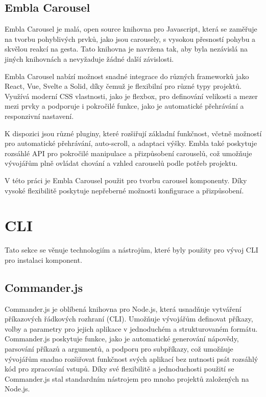 \subsection{Embla Carousel}
Embla Carousel je malá, open source knihovna pro Javascript, která se zaměřuje na tvorbu pohyblivých prvků, jako jsou carousely, s vysokou přesností pohybu a skvělou reakcí na gesta. Tato knihovna je navržena tak, aby byla nezávislá na jiných knihovnách a nevyžaduje žádné další závislosti. \cite{EmblaCarousel}

Embla Carousel nabízí možnost snadné integrace do různých frameworků jako React, Vue, Svelte a Solid, díky čemuž je flexibilní pro různé typy projektů. Využívá moderní CSS vlastnosti, jako je flexbox, pro definování velikosti a mezer mezi prvky a podporuje i pokročilé funkce, jako je automatické přehrávání a responzivní nastavení.

K dispozici jsou různé pluginy, které rozšiřují základní funkčnost, včetně možností pro automatické přehrávání, auto-scroll, a adaptaci výšky. Embla také poskytuje rozsáhlé API pro pokročilé manipulace a přizpůsobení carouselů, což umožňuje vývojářům plně ovládat chování a vzhled carouselů podle potřeb projektu.

V této práci je Embla Carousel použit pro tvorbu carousel komponenty. Díky vysoké flexibilitě poskytuje nepřeberné možnosti konfigurace a přizpůsobení.

\section{CLI}
Tato sekce se věnuje technologiím a nástrojům, které byly použity pro vývoj CLI pro instalaci komponent.

\subsection{Commander.js}
Commander.js je oblíbená knihovna pro Node.js, která usnadňuje vytváření příkazových řádkových rozhraní (CLI). Umožňuje vývojářům definovat příkazy, volby a parametry pro jejich aplikace v jednoduchém a strukturovaném formátu. Commander.js poskytuje funkce, jako je automatické generování nápovědy, parsování příkazů a argumentů, a podporu pro subpříkazy, což umožňuje vývojářům snadno rozšiřovat funkčnost svých aplikací bez nutnosti psát rozsáhlý kód pro zpracování vstupů. Díky své flexibilitě a jednoduchosti použití se Commander.js stal standardním nástrojem pro mnoho projektů založených na Node.js. \cite{CommanderJS}


